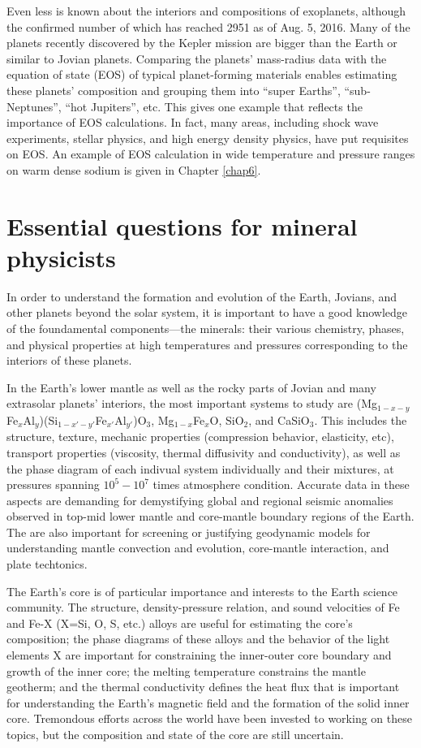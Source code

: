 Even less is known about the interiors and compositions of exoplanets, although the confirmed number of which has reached 2951 as of Aug. 5, 2016. Many of the planets recently discovered by the Kepler mission \cite{keplerpj} are bigger than the Earth or similar to Jovian planets. Comparing the planets' mass-radius data with the equation of state (EOS) of typical planet-forming materials enables estimating these planets' composition \cite{Seager2007} and grouping them into ``super Earths'', ``sub-Neptunes'', ``hot Jupiters'', etc. This gives one example that reflects the importance of EOS calculations. In fact, many areas, including shock wave experiments, stellar physics, and high energy density physics, have put requisites on EOS. An example of EOS calculation in wide temperature and pressure ranges on warm dense sodium is given in Chapter \ref{chap6}.

\section{Essential questions for mineral physicists}\label{ch2s2}
In order to understand the formation and evolution of the Earth, Jovians, and other planets beyond the solar system, it is important to have a good knowledge of the foundamental components---the minerals: their various chemistry, phases, and physical properties at high temperatures and pressures corresponding to the interiors of these planets.

In the Earth's lower mantle as well as the rocky parts of Jovian and many extrasolar planets' interiors, the most important systems to study are (Mg$_{1-x-y}$Fe$_{x}$Al$_{y}$)(Si$_{1-x'-y'}$Fe$_{x'}$Al$_{y'}$)O$_3$, 
Mg$_{1-x}$Fe$_x$O, SiO$_2$, and CaSiO$_3$. This includes the structure, texture, mechanic properties (compression behavior, elasticity, etc), transport properties (viscosity, thermal diffusivity and conductivity), as well as the phase diagram of each indivual system individually and their mixtures, at pressures spanning $10^5-10^7$ times atmosphere condition. Accurate data in these aspects are demanding for demystifying global and regional seismic anomalies observed in top-mid lower mantle and core-mantle boundary regions of the Earth. The are also important for screening or justifying geodynamic models for understanding mantle convection and evolution, core-mantle interaction, and plate techtonics.

The Earth's core is of particular importance and interests to the Earth science community. The structure, density-pressure relation, and sound velocities \cite{Badro2014} of Fe and Fe-X (X=Si, O, S, etc.) alloys are useful for estimating the core's composition; the phase diagrams of these alloys and the behavior of the light elements X \cite{Hirose2013,ORourke2016} are important for constraining the inner-outer core boundary and growth of the inner core; the melting temperature \cite{Aquilanti2015} constrains the mantle geotherm; and the thermal conductivity \cite{Ohta2016,Konopkova2016} defines the heat flux that is important for understanding the Earth's magnetic field and the formation of the solid inner core. Tremondous efforts across the world have been invested to working on these topics, but the composition and state of the core are still uncertain.

